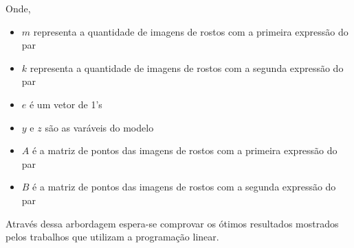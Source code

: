 Onde, 
\begin{itemize}
\item \textbf {$m$} representa a quantidade de imagens de rostos com a primeira expressão do par
\item \textbf {$k$} representa a quantidade de imagens de rostos com a segunda expressão do par
\item \textbf {$e$} é um vetor de 1's
\item \textbf {$y$} e {$z$} são as varáveis do modelo
\item \textbf {$A$} é a matriz de pontos das imagens de rostos com a primeira expressão do par
\item \textbf {$B$} é a matriz de pontos das imagens de rostos com a segunda expressão do par
\end{itemize}



Através dessa arbordagem espera-se comprovar os ótimos resultados mostrados pelos trabalhos que utilizam a programação linear.


